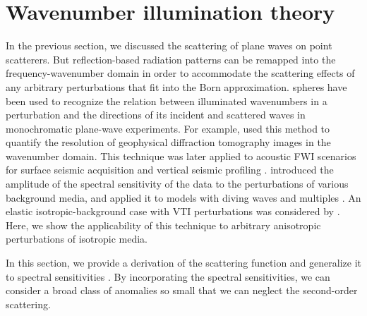 \section{Wavenumber illumination theory}
In the previous section, we discussed the scattering of plane waves on point 
scatterers. But reflection-based radiation patterns can be 
remapped into the frequency-wavenumber domain in order to accommodate the scattering effects of any arbitrary perturbations that fit into the Born approximation.
%
\cite{ewald1969} spheres have been used to recognize the relation between illuminated wavenumbers in a perturbation and the directions of its incident and scattered waves in monochromatic plane-wave experiments. 
For example, \cite{devaney1984} used this 
method to quantify the resolution of geophysical diffraction tomography images in the
wavenumber domain. This technique was later applied to acoustic FWI scenarios 
for surface seismic acquisition \citep{mora1989} and vertical seismic profiling 
\citep{wu:11}. \cite{kazei2013gp} introduced the amplitude of the spectral 
sensitivity of the data to the perturbations of various background media, and applied it to models with diving waves and multiples \citep{kazei2015seg,kazei2013spectral}. An elastic isotropic-background case 
with VTI perturbations was considered by \cite{podgornova}. Here, we show the 
applicability of this technique to arbitrary anisotropic perturbations of isotropic media. 
%
% 


In this section, we provide a derivation of the 
scattering function and 
generalize it to spectral sensitivities 
\citep{kazei2013gp,podgornova,kazei2017}.
%
By incorporating the spectral sensitivities, we can consider a broad class of anomalies 
so small that we can neglect the second-order scattering. 
%
 

% 

%
%
%

%


